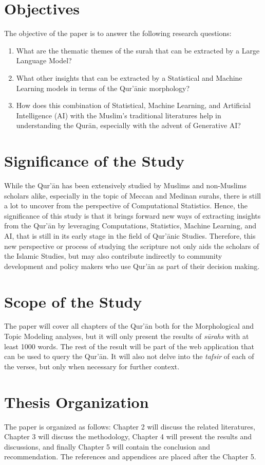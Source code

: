 \section{Objectives}\label{sec:objectives}
The objective of the paper is to answer the following research questions:
\begin{enumerate}
    \item What are the thematic themes of the surah that can be extracted by a Large Language Model?
    
    \item What other insights that can be extracted by a Statistical and Machine Learning models in terms of the Qur'\=anic morphology?
    
    \item How does this combination of Statistical, Machine Learning, and Artificial Intelligence (AI) with the Muslim's traditional literatures help in understanding the Qur\=an, especially with the advent of Generative AI?
\end{enumerate}
\section{Significance of the Study}\label{sec:significance}
While the Qur'\=an has been extensively studied by Muslims and non-Muslims scholars alike, especially in the topic of Meccan and Medinan surahs, there is still a lot to uncover from the perspective of Computational Statistics. Hence, the significance of this study is that it brings forward new ways of extracting insights from the Qur'\=an by leveraging Computations, Statistics, Machine Learning, and AI, that is still in its early stage in the field of Qur'\=anic Studies. Therefore, this new perspective or process of studying the scripture not only aids the scholars of the Islamic Studies, but may also contribute indirectly to community development and policy makers who use Qur'\=an as part of their decision making.
\section{Scope of the Study}
The paper will cover all chapters of the Qur'\=an both for the Morphological and Topic Modeling analyses, but it will only present the results of \textit{s\=urahs}  with at least 1000 words. The rest of the result will be part of the web application that can be used to query the Qur'\=an. It will also not delve into the \textit{tafsir}  of each of the verses, but only when necessary for further context.
\section{Thesis Organization}
The paper is organized as follows: Chapter 2 will discuss the related literatures, Chapter 3 will discuss the methodology, Chapter 4 will present the results and discussions, and finally Chapter 5 will contain the conclusion and recommendation. The references and appendices are placed after the Chapter 5.